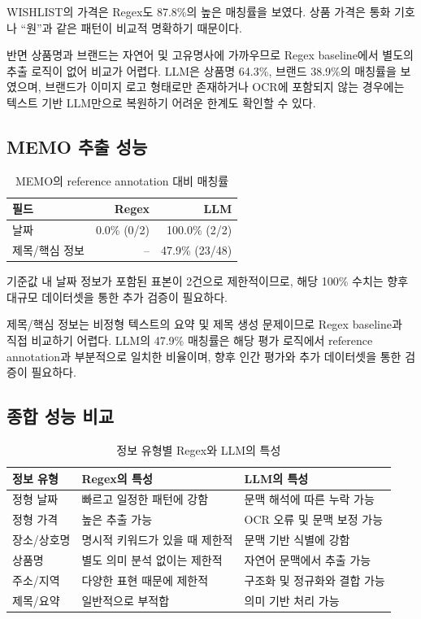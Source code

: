 \documentclass[11pt,a4paper]{article}
\begin{document}
WISHLIST의 가격은 Regex도 87.8\%의 높은 매칭률을 보였다. 상품 가격은 통화 기호나 ``원''과 같은 패턴이 비교적 명확하기 때문이다.

반면 상품명과 브랜드는 자연어 및 고유명사에 가까우므로 Regex baseline에서 별도의 추출 로직이 없어 비교가 어렵다. LLM은 상품명 64.3\%, 브랜드 38.9\%의 매칭률을 보였으며, 브랜드가 이미지 로고 형태로만 존재하거나 OCR에 포함되지 않는 경우에는 텍스트 기반 LLM만으로 복원하기 어려운 한계도 확인할 수 있다.

\subsection{MEMO 추출 성능}

\begin{table}[H]
\centering
\small
\begin{tabularx}{0.92\linewidth}{l r r}
\toprule
\textbf{필드} & \textbf{Regex} & \textbf{LLM}\\
\midrule
날짜 & 0.0\% (0/2) & 100.0\% (2/2)\\
제목/핵심 정보 & -- & 47.9\% (23/48)\\
\bottomrule
\end{tabularx}
\caption{MEMO의 reference annotation 대비 매칭률}
\end{table}

기준값 내 날짜 정보가 포함된 표본이 2건으로 제한적이므로, 해당 100\% 수치는 향후 대규모 데이터셋을 통한 추가 검증이 필요하다.

제목/핵심 정보는 비정형 텍스트의 요약 및 제목 생성 문제이므로 Regex baseline과 직접 비교하기 어렵다. LLM의 47.9\% 매칭률은 해당 평가 로직에서 reference annotation과 부분적으로 일치한 비율이며, 향후 인간 평가와 추가 데이터셋을 통한 검증이 필요하다.

\subsection{종합 성능 비교}

\begin{table}[H]
\centering
\small
\begin{tabularx}{\linewidth}{l Y Y}
\toprule
\textbf{정보 유형} & \textbf{Regex의 특성} & \textbf{LLM의 특성}\\
\midrule
정형 날짜 & 빠르고 일정한 패턴에 강함 & 문맥 해석에 따른 누락 가능\\
정형 가격 & 높은 추출 가능 & OCR 오류 및 문맥 보정 가능\\
장소/상호명 & 명시적 키워드가 있을 때 제한적 & 문맥 기반 식별에 강함\\
상품명 & 별도 의미 분석 없이는 제한적 & 자연어 문맥에서 추출 가능\\
주소/지역 & 다양한 표현 때문에 제한적 & 구조화 및 정규화와 결합 가능\\
제목/요약 & 일반적으로 부적합 & 의미 기반 처리 가능\\
\bottomrule
\end{tabularx}
\caption{정보 유형별 Regex와 LLM의 특성}
\end{table}
\end{document}
